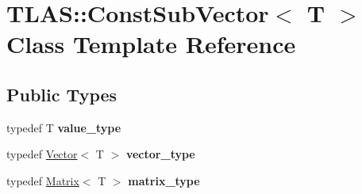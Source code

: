 \hypertarget{classTLAS_1_1ConstSubVector}{}\section{T\+L\+AS\+:\+:Const\+Sub\+Vector$<$ T $>$ Class Template Reference}
\label{classTLAS_1_1ConstSubVector}
\subsection*{Public Types}
\begin{DoxyCompactItemize}
\item 
\mbox{\label{classTLAS_1_1ConstSubVector_a2416a9fbe9300ad488a9d57dd0eb5c03}} 
typedef T {\bfseries value\+\_\+type}
\item 
\mbox{\label{classTLAS_1_1ConstSubVector_a7778cbe85ee868cfc841fbb4a1c4b85e}} 
typedef \hyperlink{classTLAS_1_1Vector}{Vector}$<$ T $>$ {\bfseries vector\+\_\+type}
\item 
\mbox{\label{classTLAS_1_1ConstSubVector_a84fb99ac9f91af1585c623b2c830a320}} 
typedef \hyperlink{classTLAS_1_1Matrix}{Matrix}$<$ T $>$ {\bfseries matrix\+\_\+type}
\end{DoxyCompactItemize}
